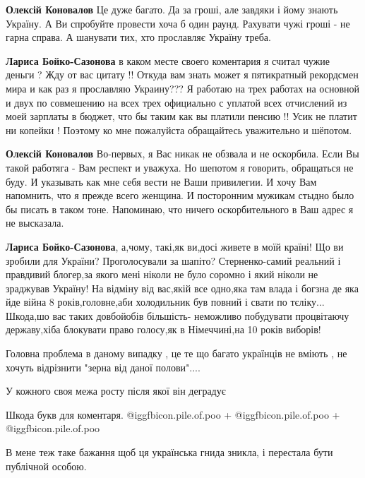 \begin{itemize}
\begin{itemize}
\begin{itemize}
\textbf{Олексій Коновалов} Це дуже багато. Да за гроші, але завдяки і йому знають Україну. А Ви спробуйте провести хоча б один раунд. Рахувати чужі гроші - не гарна справа. А шанувати тих, хто прославляє Україну треба.

\textbf{Лариса Бойко-Сазонова} в каком месте своего коментария я считал чужие деньги ? Жду от вас цитату !! Откуда вам знать может я пятикратный рекордсмен мира и как раз я прославляю Украину??? Я работаю на трех работах на основной и двух по совмешению на всех трех официально с уплатой всех отчислений из моей зарплаты в бюджет, что бы таким как вы платили пенсию !! Усик не платит ни копейки ! Поэтому ко мне пожалуйста обращайтесь уважительно и шёпотом.

\textbf{Олексій Коновалов} Во-первых, я Вас никак не обзвала и не оскорбила. Если Вы такой работяга - Вам респект и уважуха. Но шепотом я говорить, обращаться не буду. И указывать как мне себя вести не Ваши привилегии. И хочу Вам напомнить, что я прежде всего женщина. И посторонним мужикам стыдно было бы писать в таком тоне. Напоминаю, что ничего оскорбительного в Ваш адрес я не высказала.
\end{itemize} %


\obeycr
\textbf{Лариса Бойко-Сазонова}, а,чому, такі,як ви,досі живете в моїй країні!
Що ви зробили для України?
Проголосували за шапіто?
Стерненко-самий реальний і правдивий блогер,за якого мені ніколи не було соромно і який ніколи не зраджував Україну!
На відміну від вас,якій все одно,яка там влада і богзна де яка йде війна 8 років,головне,аби холодильник був повний і свати по тєліку...
Шкода,шо вас таких довбойобів більшість- неможливо побудувати процвітаючу державу,хіба блокувати право голосу,як в Німеччині,на 10 років виборів!
\restorecr

\end{itemize} %

Головна проблема в даному випадку , це те що багато українців не вміють , не хочуть відрізнити "зерна від даної полови"....

У кожного своя межа росту після якої він деградує

Шкода букв для коментаря.  @igg{fbicon.pile.of.poo} + @igg{fbicon.pile.of.poo} + @igg{fbicon.pile.of.poo} 

В мене теж таке бажання щоб ця українська гнида зникла, і перестала бути публічной особою.


\end{itemize}
